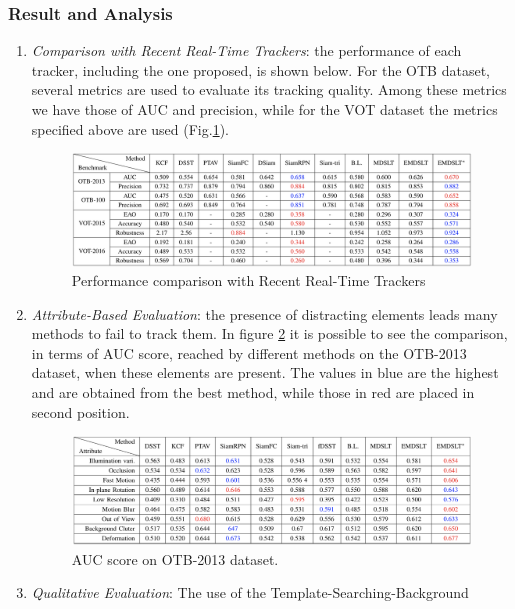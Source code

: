 \subsubsection{Result and Analysis}
\begin{enumerate}
    \item \emph{Comparison with Recent Real-Time Trackers}: the performance of each tracker, including the one proposed, is shown below. For the OTB dataset, several metrics are used to evaluate its tracking quality. Among these metrics we have those of AUC and precision, while for the VOT dataset the metrics specified above are used (Fig.\ref{fig:PerfComp}).
    \begin{figure}[h!]
        \centering
        \includegraphics[width = \linewidth]{images/paper8/metrics.png}
        \centering
        \caption{Performance comparison with Recent Real-Time Trackers}
        \label{fig:PerfComp}
    \end{figure}
    \item \emph{Attribute-Based Evaluation}: the presence of distracting elements leads 
    many methods to fail to track them. In figure \ref{fig:AUCScore} it is possible to see the 
    comparison, in terms of AUC score, reached by different methods on 
    the OTB-2013 dataset, when these elements are present. The values 
    in blue are the highest and are obtained from the best method, while 
    those in red are placed in second position.
    \begin{figure}[h!]
        \centering
        \includegraphics[width = \linewidth]{images/paper8/AUC.png}
        \centering
        \caption{AUC score on OTB-2013 dataset.}
        \label{fig:AUCScore}
    \end{figure}
    \item \emph{Qualitative Evaluation}: The use of the Template-Searching-Background 

\end{enumerate}
